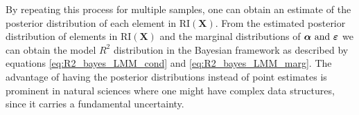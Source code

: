 By repeating this process for multiple samples, one can obtain an estimate of the posterior distribution of each element in $\text{RI}(\mathbf{X})$.
From the estimated posterior distribution of elements in $\text{RI}(\mathbf{X})$ and the marginal distributions of $\boldsymbol{\alpha$ and $\boldsymbol{\varepsilon}}$ we can obtain the model $R^2$ distribution in the Bayesian framework as described by equations \eqref{eq:R2_bayes_LMM_cond} and \eqref{eq:R2_bayes_LMM_marg}.
The advantage of having the posterior distributions instead of point estimates is prominent in natural sciences where one might have complex data structures, since it carries a fundamental uncertainty.





